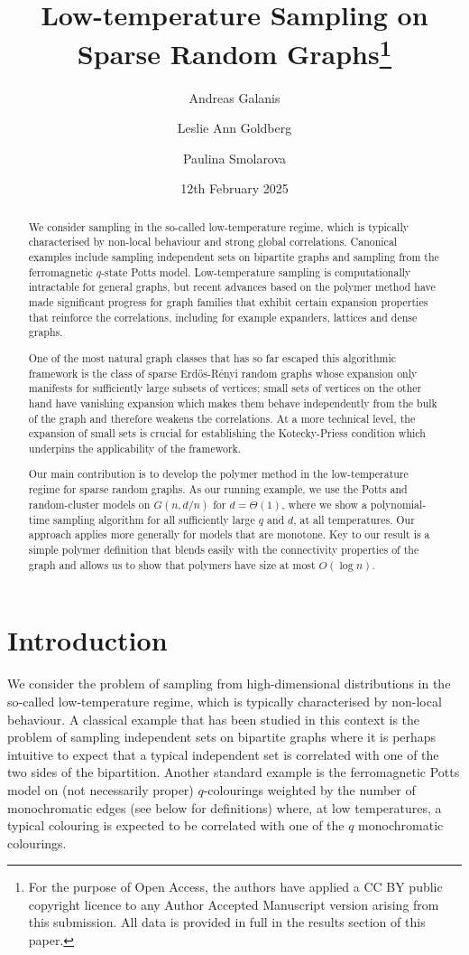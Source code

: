 \documentclass[11pt]{article}
\title{Low-temperature Sampling  on Sparse Random Graphs\thanks{For the purpose of Open Access, the authors have applied a CC BY public copyright licence to any Author Accepted Manuscript version arising from this submission. All data is provided in full in the results section of this paper.}}
\author{Andreas Galanis \and Leslie Ann Goldberg \and Paulina Smolarova}
\date{12th February 2025}
\theoremstyle{plain}
\newcommand{\1}{\mathbb{1}}
\begin{document}
\maketitle
\begin{abstract}
We consider sampling in the so-called low-temperature regime, which is typically characterised by non-local behaviour and strong global correlations. Canonical examples include sampling independent sets on bipartite graphs and sampling from the ferromagnetic $q$-state Potts model. Low-temperature sampling is computationally intractable for general graphs, but recent advances based on the polymer method have made significant progress for graph families that exhibit certain expansion properties that reinforce the correlations, including for example expanders, lattices and dense graphs.

One of the most natural graph classes that has so far escaped this algorithmic framework is the class of sparse Erd\H{o}s-R\'enyi random graphs whose expansion only manifests for sufficiently large subsets of vertices; small sets of vertices on the other hand have vanishing expansion which makes them behave independently from the bulk of the graph and therefore weakens the correlations. At a more technical level, the expansion of small sets is crucial for establishing the Kotecky-Priess condition which underpins the applicability of the  framework.

Our main contribution is to develop the polymer method in the low-temperature regime for sparse random graphs. As our running example, we use the Potts and random-cluster models on $G(n,d/n)$ for $d=\Theta(1)$, where we show a polynomial-time sampling algorithm for all sufficiently large $q$ and $d$, at all temperatures. Our approach applies more generally for models that are monotone. Key to our result is a simple polymer definition that blends easily with the connectivity properties of the graph and allows us to show that polymers have size at most $O(\log n)$.


\end{abstract}

\section{Introduction}



 We consider the problem of sampling from high-dimensional distributions in the so-called low-temperature regime, which is typically characterised by non-local behaviour. 
A classical example that has been studied in this context is the problem of sampling independent sets on bipartite graphs where it is perhaps intuitive to expect that a typical independent set is correlated with one of the two sides of the bipartition. Another standard example is the ferromagnetic Potts model  on (not necessarily proper) $q$-colourings weighted by the number of monochromatic edges (see below for definitions) where, at low temperatures, a typical colouring is expected to be  correlated with  one of the $q$ monochromatic colourings.
\end{document}
